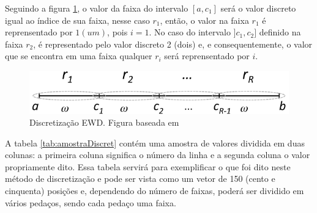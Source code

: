 Seguindo a figura \ref{fig:faixasEWD}, o valor da faixa do intervalo ${[a,c_1]}$ será o valor discreto igual ao índice de sua faixa, nesse caso ${r_1}$, então, o valor na faixa ${r_1}$ é reprensentado por ${1(um)}$, pois  ${i=1}$. No caso do intervalo ${]c_1,c_2]}$ definido na faixa  ${r_2}$, é representado pelo valor discreto 2 (dois) e, e consequentemente, o valor que se encontra em uma faixa qualquer ${r_i}$ será reprensentado por ${i}$.

\begin{figure}[h] 
        \centering
        \includegraphics[scale=0.6]{figs/discretizacaoEWD.png}
        \caption[Discretização EWD]{Discretização EWD. Figura baseada em \cite{Lopes2016}}%
        \label{fig:faixasEWD}
\end{figure}

A tabela \ref{tab:amostraDiscret} contém uma amostra de valores dividida em duas colunas: a primeira coluna significa o número da linha e a segunda coluna o valor propriamente dito. Essa tabela servirá para exemplificar o que foi dito neste método de discretização e pode ser vista como um vetor de 150 (cento e cinquenta) posições e, dependendo do número de faixas, poderá ser dividido em vários pedaços, sendo cada pedaço uma faixa. 

